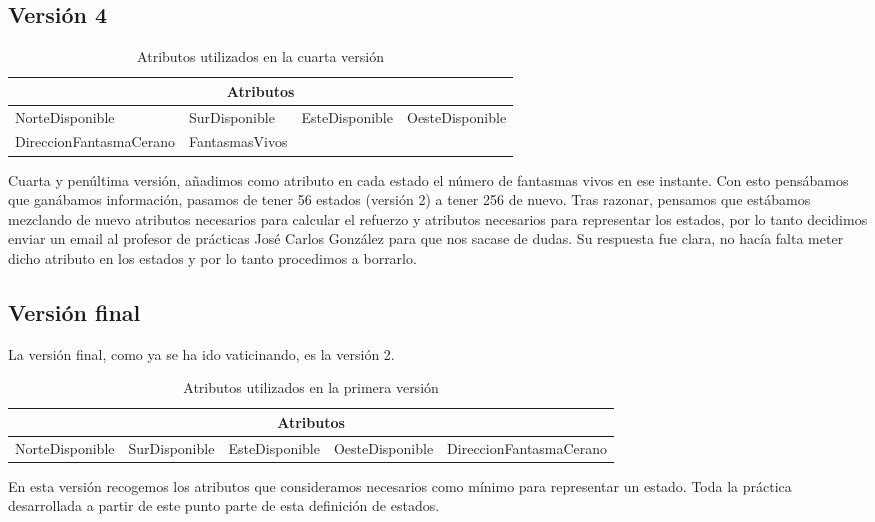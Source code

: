 \documentclass[11pt,a4paper]{article}
\begin{document}
\subsection{Versión 4}

\begin{table}[H]
\centering
\label{AtributosV4}
\begin{tabular}{|l|l|ll}
\hline
\multicolumn{4}{|c|}{\textbf{Atributos}} \\ \hline
NorteDisponible & SurDisponible & \multicolumn{1}{l|}{EsteDisponible} & \multicolumn{1}{l|}{OesteDisponible} \\ \hline
DireccionFantasmaCerano & FantasmasVivos &  &  \\ \cline{1-2}
\end{tabular}
\caption{Atributos utilizados en la cuarta versión}
\end{table}
Cuarta y penúltima versión, añadimos como atributo en cada estado el número de fantasmas vivos en ese instante. Con esto pensábamos que ganábamos información, pasamos de tener 56 estados (versión 2) a tener 256 de nuevo. 
Tras razonar, pensamos que estábamos mezclando de nuevo atributos necesarios para calcular el refuerzo y atributos necesarios para representar los estados, por lo tanto decidimos enviar un email al profesor de prácticas José Carlos González para que nos sacase de dudas. Su respuesta fue clara, no hacía falta meter dicho atributo en los estados y por lo tanto procedimos a borrarlo.

\subsection{Versión final}
La versión final, como ya se ha ido vaticinando, es la versión 2.

\begin{table}[H]
\centering
\label{AtributosVF}
\begin{tabular}{|l|l|l|l|l|}
\hline
\multicolumn{5}{|c|}{\textbf{Atributos}}                                                     \\ \hline
NorteDisponible & SurDisponible & EsteDisponible & OesteDisponible & DireccionFantasmaCerano \\ \hline
\end{tabular}
\caption{Atributos utilizados en la primera versión}
\end{table}

En esta versión recogemos los atributos que consideramos necesarios como mínimo para representar un estado. Toda la práctica desarrollada a partir de este punto parte de esta definición de estados.
\end{document}

